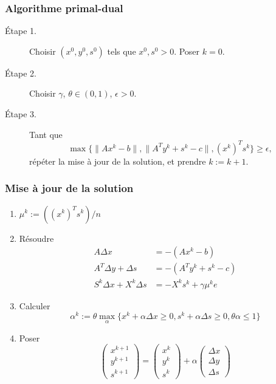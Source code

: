 \documentclass[usepdftitle=false]{beamer}
\begin{document}
\begin{frame}
\frametitle{Algorithme primal-dual}

\begin{description}
\item[Étape 1.]
Choisir $(x^0, y^0, s^0)$ tels que $x^0, s^0 > 0$. Poser $k = 0$.
\item[Étape 2.]
Choisir $\gamma$, $\theta \in (0,1)$, $\epsilon > 0$.
\item[Étape 3.]
Tant que
$$
\max \{ \| Ax^k - b \|, \| A^Ty^k + s^k - c \|, (x^k)^Ts^k \} \geq \epsilon,
$$
répéter la mise à jour de la solution, et prendre $k := k+1$.
\end{description}

\end{frame}

\begin{frame}
\frametitle{Mise à jour de la solution}

\begin{enumerate}
	\item $\mu^k := ((x^k)^Ts^k)/n$
	\item Résoudre
	\begin{align*}
	A\Delta x & = -(Ax^k-b) \\
	A^T\Delta y + \Delta s &= -(A^Ty^k+s^k-c) \\
	S^k \Delta x +X^k\Delta s &= -X^ks^k + \gamma \mu^k e
	\end{align*}
	\item
	Calculer
	$$
	\alpha^k := \theta \max_{\alpha} \{ x^k+\alpha \Delta x \geq 0 , s^k + \alpha \Delta s \geq 0, \theta \alpha \leq 1 \}
	$$
	\item Poser
$$
\begin{pmatrix} x^{k+1} \\ y^{k+1} \\ s^{k+1} \end{pmatrix}
=
\begin{pmatrix} x^k \\ y^k \\ s^k \end{pmatrix}
+\alpha
\begin{pmatrix}
\Delta x \\ \Delta y \\ \Delta s
\end{pmatrix}
$$
	\end{enumerate}

\end{frame}
\end{document}
